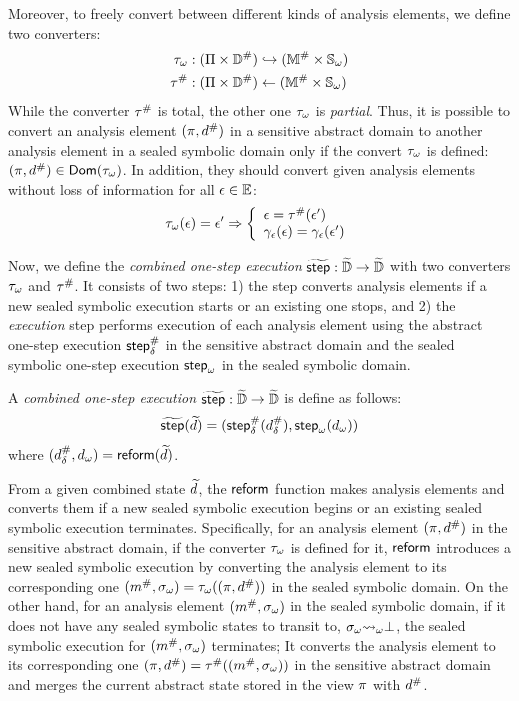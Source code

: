 Moreover, to freely convert between different kinds of analysis elements, we define two converters:
\begin{align}
  {\tau}_\omega & : (\Pi \times {\mathbb{D}}^{\#}) \hookrightarrow
    ({\mathbb{M}}^{\#} \times {\mathbb{S}}_\omega)\\
  {\tau}^{\#} & : (\Pi \times
    {\mathbb{D}}^{\#}) \leftarrow ({\mathbb{M}}^{\#} \times {\mathbb{S}}_\omega)
\end{align}
While the converter ${\tau}^{\#}$ is total, the other one ${\tau}_\omega$ is
\textit{partial}. Thus, it is possible to convert an analysis element
$(\pi, {d}^{\#})$ in a sensitive abstract domain to another analysis element in
a sealed symbolic domain only if the convert ${\tau}_\omega$ is defined: $(\pi,
{d}^{\#}) \in \textsf{Dom}({\tau}_\omega)$.  In addition, they should convert given
analysis elements without loss of information for all $\epsilon \in \mathbb{E}$:
\[
  {\tau}_\omega(\epsilon) = \epsilon' \Rightarrow \left\{
  \begin{array}{l}
    \epsilon = {\tau}^{\#}(\epsilon')\\
    \gamma_{\epsilon}(\epsilon) = \gamma_{\epsilon}(\epsilon')\\
  \end{array}
  \right.
\]

Now, we define the \textit{combined one-step execution} $\widetilde{\textsf{step}}: \widetilde{\mathbb{D}}
\rightarrow \widetilde{\mathbb{D}}$ with two converters ${\tau}_\omega$ and ${\tau}^{\#}$.
It consists of two steps: 1) the \textit{} step converts
analysis elements if a new sealed symbolic execution starts or an
existing one stops, and 2) the \textit{execution} step performs execution of each
analysis element using the abstract one-step execution ${\textsf{step}}^{\#}_\delta$ in the sensitive
abstract domain and the sealed symbolic one-step execution ${\textsf{step}}_\omega$ in the sealed
symbolic domain.
\begin{definition}
A \textit{combined one-step execution} $\widetilde{\textsf{step}}: \widetilde{\mathbb{D}} \rightarrow
\widetilde{\mathbb{D}}$ is define as follows:
  \[
    \widetilde{\textsf{step}}(\widetilde{d}) = ({\textsf{step}}^{\#}_\delta({{d}^{\#}_\delta}), {\textsf{step}}_\omega({{d}_\omega}))
  \]
where $({{d}^{\#}_\delta}, {{d}_\omega}) = \textsf{reform}(\widetilde{d})$.
\end{definition}

From a given combined state $\widetilde{d}$, the $\textsf{reform}$ function makes analysis elements
and converts them if a new sealed symbolic execution
begins or an existing sealed symbolic execution terminates.
Specifically, for an analysis element $(\pi, {d}^{\#})$ in the sensitive abstract domain,
if the converter ${\tau}_\omega$ is defined for it, $\textsf{reform}$ introduces a new sealed symbolic execution
by converting the analysis element to its corresponding one $({m}^{\#}, {\sigma}_\omega) =
{\tau}_\omega((\pi, {d}^{\#}))$ in the sealed symbolic domain.
On the other hand, for an analysis element $({m}^{\#}, {\sigma}_\omega)$ in the sealed symbolic domain,
if it does not have any sealed symbolic states to transit to, ${\sigma}_\omega {\leadsto}_\omega \bot$,
the sealed symbolic execution for $({m}^{\#}, {\sigma}_\omega)$ terminates;
It converts the analysis element to its corresponding one $(\pi, {d}^{\#}) =
{\tau}^{\#}(({m}^{\#}, {\sigma}_\omega))$ in the sensitive abstract domain and
merges the current abstract state stored in the view $\pi$ with ${d}^{\#}$.

